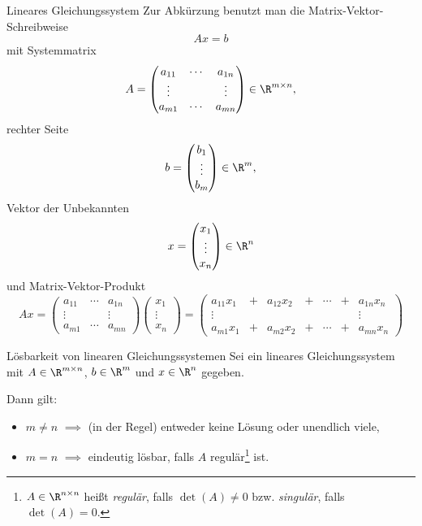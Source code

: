 \begin{defi}{Lineares Gleichungssystem}
    Zur Abkürzung benutzt man die Matrix-Vektor-Schreibweise
    \[
        Ax = b
    \]
    mit Systemmatrix
    \[
        A =
        \begin{pmatrix}
            a_{11} & \cdots & a_{1n} \\
            \vdots &        & \vdots \\
            a_{m1} & \cdots & a_{mn}
        \end{pmatrix}
        \in \R^{m \times n},
    \]
    rechter Seite
    \[
        b =
        \begin{pmatrix}
            b_1    \\
            \vdots \\
            b_m
        \end{pmatrix}
        \in \R^{m},
    \]
    Vektor der Unbekannten
    \[
        x =
        \begin{pmatrix}
            x_1    \\
            \vdots \\
            x_n
        \end{pmatrix}
        \in \R^{n}
    \]
    und Matrix-Vektor-Produkt
    \[
        Ax =
        \begin{pmatrix}
            a_{11} & \cdots & a_{1n} \\
            \vdots &        & \vdots \\
            a_{m1} & \cdots & a_{mn}
        \end{pmatrix}
        \begin{pmatrix}
            x_1    \\
            \vdots \\
            x_n
        \end{pmatrix}
        =
        \begin{pmatrix}
            a_{11}x_1 & + & a_{12}x_2 & + & \cdots & + & a_{1n}x_n \\
            \vdots    &   &           &   &        &   & \vdots    \\
            a_{m1}x_1 & + & a_{m2}x_2 & + & \cdots & + & a_{mn}x_n
        \end{pmatrix}
    \]
\end{defi}

\begin{bonus}{Lösbarkeit von linearen Gleichungssystemen}
    Sei ein lineares Gleichungssystem mit $A \in \R^{m \times n}$, $b \in \R^{m}$ und $x \in \R^{n}$ gegeben.

    Dann gilt:
    \begin{itemize}
        \item $m \neq n$ $\implies$ (in der Regel) entweder keine Lösung oder unendlich viele,
        \item $m = n$ $\implies$ eindeutig lösbar, falls $A$ regulär\footnote{$A \in \R^{n\times n}$ heißt \emph{regulär}, falls $\det(A) \neq 0$ bzw. \emph{singulär}, falls $\det(A) = 0$.} ist.
    \end{itemize}
\end{bonus}

